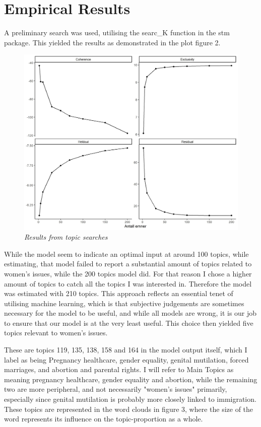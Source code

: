 \documentclass[12pt]{article}
\begin{document}
	\section{Empirical Results}
	
	A preliminary search was used, utilising the searc\_K function in the stm package. This yielded the results as demonstrated in the plot figure 2.
	
	\begin{figure}
		\centering
		\includegraphics[scale=0.60]{ksearch.jpg}
		\caption{\textit{Results from topic searches}}
	\end{figure}
	
	While the model seem to indicate an optimal input at around 100 topics, while estimating, that model failed to report a substantial amount of topics related to women's issues, while the 200 topics model did. For that reason I chose a higher amount of topics to catch all the topics I was interested in. Therefore the model was estimated with 210 topics. This approach reflects an essential tenet of utilising machine learning, which is that subjective judgements are sometimes necessary for the model to be useful, and while all models are wrong, it is our job to ensure that our model is at the very least useful. This choice then yielded five topics relevant to women's issues.
	
	These are topics 119, 135, 138, 158 and 164 in the model output itself, which I label as being Pregnancy healthcare, gender equality, genital mutilation, forced marriages, and abortion and parental rights. I will refer to Main Topics as meaning pregnancy healthcare, gender equality and abortion, while the remaining two are more peripheral, and not necessarily "women's issues" primarily, especially since genital mutilation is probably more closely linked to immigration. These topics are represented in the word clouds in figure 3, where the size of the word represents its influence on the topic-proportion as a whole.
	
\end{document}
